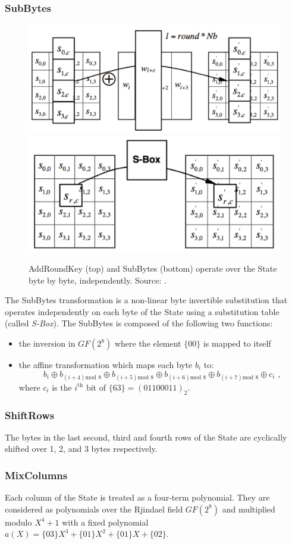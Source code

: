 \subsubsection*{SubBytes}
\begin{figure}
\centering
\includegraphics[width = .60\textwidth]{../Figures/FISP_AES/add_round_key.pdf} 
\includegraphics[width = .45\textwidth]{../Figures/FISP_AES/sbox.pdf} 
\caption[AddRoundKey and SubBytes.]{AddRoundKey (top) and SubBytes (bottom) operate over the State byte by byte, independently. Source: \cite{nist197}.}\label{fig:AES_sbox}
\end{figure}
The SubBytes transformation is a non-linear byte invertible substitution that operates independently on each byte of the State using a substitution table (called \emph{S-Box}). The SubBytes is composed of the following two functions:
\begin{itemize}
\item the inversion in $GF(2^8)$ where the element $\{00\}$ is mapped to itself
\item the affine transformation which maps each byte $b_i$ to:
\begin{equation}
b_i \oplus b_{(i+4)\mbox{mod }8} \oplus b_{(i+5)\mbox{mod }8} \oplus b_{(i+6)\mbox{mod }8} \oplus b_{(i+7)\mbox{mod }8} \oplus c_i \mbox{ ,}
\end{equation}
 where $c_i$ is the $i^\text{th}$ bit of $\{63\}  = (01100011)_2$.
\end{itemize}  
\subsubsection*{ShiftRows}
The bytes in the last second, third and fourth rows of the State are cyclically shifted over 1, 2, and 3 bytes respectively.
\subsubsection*{MixColumns}
Each column of the State is treated as a four-term polynomial. They are considered as polynomials over the Rjindael field $GF(2^8)$ and multiplied modulo $X^4 +1$ with a fixed polynomial $a(X) = \{03\}X^3 +\{01\}X^2 + \{01\}X + \{02\}$.

